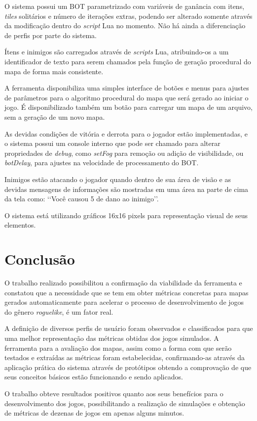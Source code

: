 	O sistema possui um BOT parametrizado com variáveis de ganância com itens, \textit{tiles} solitários e número de iterações extras, podendo ser alterado somente através da modificação dentro do \textit{script} Lua no momento. Não há ainda a diferenciação de perfis por parte do sistema. 
	
	Ítens e inimigos são carregados através de \textit{scripts} Lua, atribuindo-os a um identificador de texto para serem chamados pela função de geração procedural do mapa de forma mais consistente. 
	
	A ferramenta disponibiliza uma simples interface de botões e menus para ajustes de parâmetros para o algoritmo procedural do mapa que será gerado ao iniciar o jogo. É disponibilizado também um botão para carregar um mapa de um arquivo, sem a geração de um novo mapa. 
	
	As devidas condições de vitória e derrota para o jogador estão implementadas, e o sistema possui um console interno que pode ser chamado para alterar propriedades de \textit{debug}, como \textit{setFog} para remoção ou adição de visibilidade, ou \textit{botDelay}, para ajustes na velocidade de processamento do BOT. 
	
	Inimigos estão atacando o jogador quando dentro de sua área de visão e as devidas mensagens de informações são mostradas em uma área na parte de cima da tela como: \lq\lq Você causou 5 de dano ao inimigo\rq\rq.
	
	O sistema está utilizando gráficos 16x16 pixels para representação visual de seus elementos. 
\section{Conclusão}
	O trabalho realizado possibilitou a confirmação da viabilidade da ferramenta e constatou que a necessidade que se tem em obter métricas concretas para mapas gerados automaticamente para acelerar o processo de desenvolvimento de jogos do gênero \textit{roguelike}, é um fator real.	
	
	A definição de diversos perfis de usuário foram observados e classificados para que uma melhor representação das métricas obtidas dos jogos simulados. 
	A ferramenta para a avaliação dos mapas, assim como a forma com que serão testados e extraídas as métricas foram estabelecidas, confirmando-as através da aplicação prática do sistema através de protótipos obtendo a comprovação de que seus conceitos básicos estão funcionando e sendo aplicados. 
	
	O trabalho obteve resultados positivos quanto aos seus benefícios para o desenvolvimento dos jogos, possibilitando a realização de simulações e obtenção de métricas de dezenas de jogos em apenas alguns minutos. 

